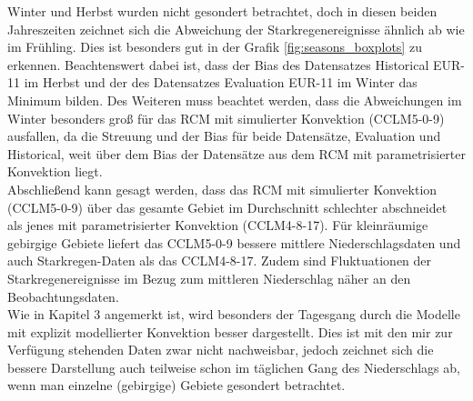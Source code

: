 Winter und Herbst wurden nicht gesondert betrachtet, doch in diesen beiden Jahreszeiten zeichnet sich die Abweichung der Starkregenereignisse ähnlich ab wie im Frühling. Dies ist besonders gut in der Grafik \ref{fig:seasons_boxplots} zu erkennen. Beachtenswert dabei ist, dass der Bias des Datensatzes Historical EUR-11 im Herbst und der des Datensatzes Evaluation EUR-11 im Winter das Minimum bilden. Des Weiteren muss beachtet werden, dass die Abweichungen im Winter besonders groß für das RCM mit simulierter Konvektion (CCLM5-0-9) ausfallen, da die Streuung und der Bias für beide Datensätze, Evaluation und Historical, weit über dem Bias der Datensätze aus dem RCM mit parametrisierter Konvektion liegt.\vspace{1pt}\\

Abschließend kann gesagt werden, dass das RCM mit simulierter Konvektion (CCLM5-0-9) über das gesamte Gebiet im Durchschnitt schlechter abschneidet als jenes mit parametrisierter Konvektion (CCLM4-8-17). Für kleinräumige gebirgige Gebiete liefert das CCLM5-0-9 bessere mittlere Niederschlagsdaten und auch Starkregen-Daten als das CCLM4-8-17. Zudem sind Fluktuationen der Starkregenereignisse im Bezug zum mittleren Niederschlag näher an den Beobachtungsdaten.\\
Wie in \cite{RCM} Kapitel 3 angemerkt ist, wird besonders der Tagesgang durch die Modelle mit explizit modellierter Konvektion besser dargestellt. Dies ist mit den mir zur Verfügung stehenden Daten zwar nicht nachweisbar, jedoch zeichnet sich die bessere Darstellung auch teilweise schon im täglichen Gang des Niederschlags ab, wenn man einzelne (gebirgige) Gebiete gesondert betrachtet.\\